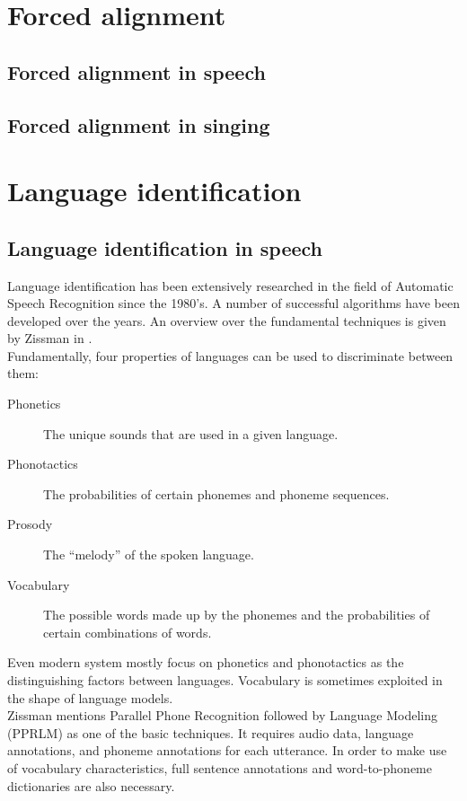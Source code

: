 \section{Forced alignment}
\subsection{Forced alignment in speech}
\subsection{Forced alignment in singing}


\section{Language identification}
\subsection{Language identification in speech}
Language identification has been extensively researched in the field of Automatic Speech Recognition since the 1980's. A number of successful algorithms have been developed over the years. An overview over the fundamental techniques is given by Zissman in \cite{zissman}.\\
Fundamentally, four properties of languages can be used to discriminate between them:
\begin{description}
 \item[Phonetics] The unique sounds that are used in a given language.
 \item[Phonotactics] The probabilities of certain phonemes and phoneme sequences.
 \item[Prosody] The ``melody'' of the spoken language.
 \item[Vocabulary] The possible words made up by the phonemes and the probabilities of certain combinations of words.
\end{description}
Even modern system mostly focus on phonetics and phonotactics as the distinguishing factors between languages. Vocabulary is sometimes exploited in the shape of language models.\\
Zissman mentions Parallel Phone Recognition followed by Language Modeling (PPRLM) as one of the basic techniques. It requires audio data, language annotations, and phoneme annotations for each utterance. In order to make use of vocabulary characteristics, full sentence annotations and word-to-phoneme dictionaries are also necessary.\\
